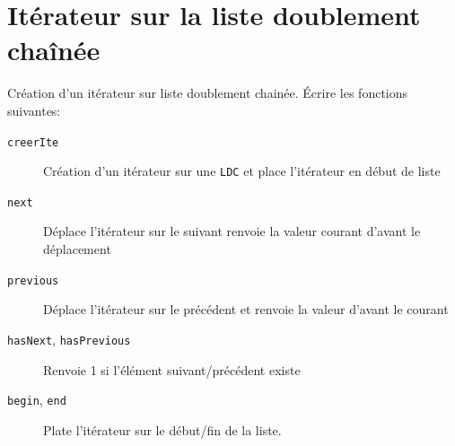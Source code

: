 \section{Itérateur sur la liste doublement chaînée}
Création d'un itérateur sur liste doublement chainée. %
Écrire les fonctions suivantes:
\begin{description}
	\item[\texttt{creerIte}] Création d'un itérateur sur une \texttt{LDC} et place l'itérateur en début de liste
	\item[\texttt{next}] Déplace l'itérateur sur le suivant renvoie la valeur courant d'avant le déplacement 
	\item[\texttt{previous}] Déplace l'itérateur sur le précédent et renvoie la valeur d'avant le courant 
	\item[\texttt{hasNext}, \texttt{hasPrevious}] Renvoie 1 si l'élément suivant/précédent existe
	\item[\texttt{begin}, \texttt{end}] Plate l'itérateur sur le début/fin de la liste.
\end{description}



